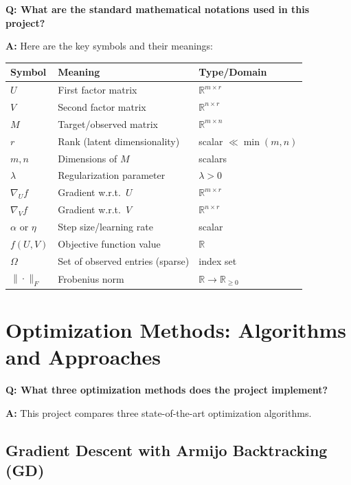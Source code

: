 \documentclass[11pt,oneside]{article}
\newcommand{\Real}{\mathbb{R}}
\newcommand{\grad}{\nabla}
\newcommand{\question}[1]{\textbf{Q: #1}}
\newcommand{\answer}{\textbf{A: }}
\begin{document}
\question{What are the standard mathematical notations used in this project?}

\answer Here are the key symbols and their meanings:

\begin{table}[h]
\centering
\begin{tabular}{lll}
\toprule
\textbf{Symbol} & \textbf{Meaning} & \textbf{Type/Domain} \\
\midrule
$U$ & First factor matrix & $\Real^{m \times r}$ \\
$V$ & Second factor matrix & $\Real^{n \times r}$ \\
$M$ & Target/observed matrix & $\Real^{m \times n}$ \\
$r$ & Rank (latent dimensionality) & scalar $\ll \min(m,n)$ \\
$m, n$ & Dimensions of $M$ & scalars \\
$\lambda$ & Regularization parameter & $\lambda > 0$ \\
$\grad_U f$ & Gradient w.r.t.\ $U$ & $\Real^{m \times r}$ \\
$\grad_V f$ & Gradient w.r.t.\ $V$ & $\Real^{n \times r}$ \\
$\alpha$ or $\eta$ & Step size/learning rate & scalar \\
$f(U, V)$ & Objective function value & $\Real$ \\
$\Omega$ & Set of observed entries (sparse) & index set \\
$\|\cdot\|_F$ & Frobenius norm & $\Real \to \Real_{\geq 0}$ \\
\bottomrule
\end{tabular}
\end{table}

\section{Optimization Methods: Algorithms and Approaches}\label{sec:methods}

\question{What three optimization methods does the project implement?}

\answer This project compares three state-of-the-art optimization algorithms.

\subsection{Gradient Descent with Armijo Backtracking (GD)}\label{subsec:gd}
\end{document}
